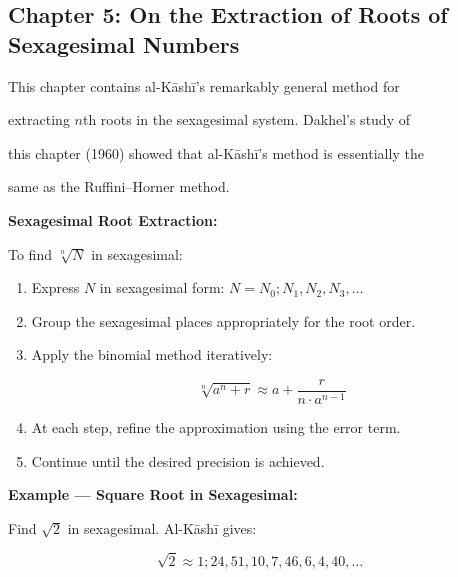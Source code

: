 \documentclass[11pt,a4paper]{article}
\newenvironment{mathalgo}{%

  \par\vspace{0.3cm}

  \begin{framed}

  \setlength{\parindent}{0pt}

}{%

  \end{framed}

  \par\vspace{0.3cm}

}
\begin{document}
\subsection{Chapter 5: On the Extraction of Roots of Sexagesimal Numbers}



This chapter contains al-K\=ash\=i's remarkably general method for

extracting $n$th roots in the sexagesimal system. Dakhel's study of

this chapter (1960) showed that al-K\=ash\=i's method is essentially the

same as the Ruffini--Horner method.



\begin{mathalgo}

\textbf{Sexagesimal Root Extraction:}



To find $\sqrt[n]{N}$ in sexagesimal:

\begin{enumerate}[nosep]

  \item Express $N$ in sexagesimal form: $N = N_0; N_1, N_2, N_3, \ldots$

  \item Group the sexagesimal places appropriately for the root order.

  \item Apply the binomial method iteratively:

    \[

    \sqrt[n]{a^n + r} \approx a + \frac{r}{n \cdot a^{n-1}}

    \]

  \item At each step, refine the approximation using the error term.

  \item Continue until the desired precision is achieved.

\end{enumerate}

\end{mathalgo}



\noindent\textbf{Example --- Square Root in Sexagesimal:}



Find $\sqrt{2}$ in sexagesimal. Al-K\=ash\=i gives:

\[

\sqrt{2} \approx 1; 24, 51, 10, 7, 46, 6, 4, 40, \ldots

\]
\end{document}
